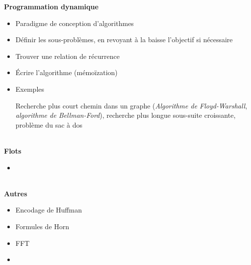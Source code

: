 \documentclass[10pt,a4paper]{article}
\newcommand{\cat}[1]{\noindent \textbf{\Large #1}}
\begin{document}
\cat{Programmation dynamique}

\begin{itemize}[noitemsep]
	\item Paradigme de conception d'algorithmes
	\item Définir les sous-problèmes, en revoyant à la baisse l'objectif si nécessaire
	\item Trouver une relation de récurrence
	\item Écrire l'algorithme (mémoïzation)
	\item Exemples
	
		Recherche plus court chemin dans un graphe (\emph{Algorithme de Floyd-Warshall}, \emph{algorithme de Bellman-Ford}), recherche plus longue sous-suite croissante, problème du sac à dos
\end{itemize}
~ \\


\cat{Flots}

\begin{itemize}[noitemsep]
	\item ~
\end{itemize}
~ \\


\cat{Autres}

\begin{itemize}[noitemsep]
	\item Encodage de Huffman
	\item Formules de Horn
	\item FFT
	\item 
\end{itemize}
\end{document}
